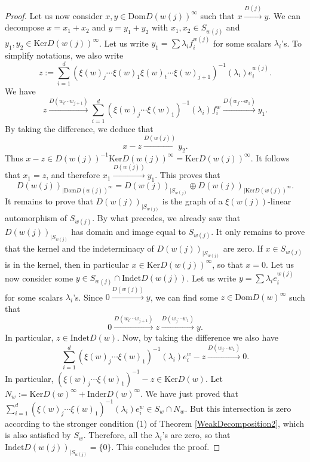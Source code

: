 \documentclass[12pt]{amsart}
\theoremstyle{definition}
\newcommand{\<}{\langle}   %
\renewcommand{\>}{\rangle} %
\begin{document}
\begin{proof}
    Let us now consider $x,y \in \mathrm{Dom}D(w(j))^{\infty}$ such that $x \xrightarrow{D(j)} y$. We can decompose $x = x_1 + x_2$ and $y = y_1 + y_2$ with $x_1,x_2 \in S_{w(j)}$ and $y_1,y_2 \in \mathrm{Ker}D(w(j))^{\infty}$. Let us write $y_1 = \sum \lambda_if_i^{w(j)}$ for some scalars $\lambda_i$'s. To simplify notations, we also write 
    \begin{equation*}
    z := \sum_{i=1}^d (\xi(w)_j\cdots \xi(w)_1\xi(w)_t\cdots \xi(w)_{j+1})^{-1}(\lambda_i) e_i^{w(j)}.
    \end{equation*}
    We have
    \begin{equation*}
         z \xrightarrow{D(w_t\cdots w_{j+1})} \sum_{i=1}^d (\xi(w)_j\cdots \xi(w)_1)^{-1}(\lambda_i) f_i^w \xrightarrow{D(w_j\cdots w_1)} y_1.
    \end{equation*}
    By taking the difference, we deduce that 
    \begin{equation*}
        x - z \xrightarrow{D(w(j))} y_2.
    \end{equation*}
    Thus $x - z \in D(w(j))^{-1} \mathrm{Ker}D(w(j))^{\infty} = \mathrm{Ker}D(w(j))^{\infty}$. It follows that $x_1 = z$, and therefore $x_1 \xrightarrow{D(w(j))} y_1$. This proves that
\begin{equation*}
    D(w(j))_{|\mathrm{Dom}D(w(j))^{\infty}} = D(w(j))_{|S_{w(j)}} \oplus D(w(j))_{|\mathrm{Ker}D(w(j))^{\infty}}.
\end{equation*}
    It remains to prove that $D(w(j))_{|S_{w(j)}}$ is the graph of a $\xi(w(j))$-linear automorphism of $S_{w(j)}$. By what precedes, we already saw that $D(w(j))_{|S_{w(j)}}$ has domain and image equal to $S_{w(j)}$. It only remains to prove that the kernel and the indeterminacy of $D(w(j))_{|S_{w(j)}}$ are zero. If $x \in S_{w(j)}$ is in the kernel, then in particular $x \in \mathrm{Ker}D(w(j))^{\infty}$, so that $x=0$. Let us now consider some $y \in S_{w(j)} \cap \mathrm{Indet}D(w(j))$. Let us write $y = \sum \lambda_ie_i^{w(j)}$ for some scalars $\lambda_i$'s. Since $0 \xrightarrow{D(w(j))} y$, we can find some $z \in \mathrm{Dom}D(w)^{\infty}$ such that 
    \begin{equation*}
        0 \xrightarrow{D(w_t\cdots w_{j+1})} z \xrightarrow{D(w_j\cdots w_1)} y.
    \end{equation*}
    In particular, $z \in \mathrm{Indet}D(w)$. Now, by taking the difference we also have
    \begin{equation*}
        \sum_{i=1}^d (\xi(w)_j\cdots \xi(w)_1)^{-1}(\lambda_i)e_i^w - z\xrightarrow{D(w_j\cdots w_1)} 0.
    \end{equation*}
    In particular, $(\xi(w)_j\cdots \xi(w)_1)^{-1} - z \in \mathrm{Ker}D(w)$. Let $N_w :=\mathrm{Ker}D(w)^{\infty} + \mathrm{Inder}D(w)^{\infty}$. We have just proved that $\sum_{i=1}^d (\xi(w)_j\cdots \xi(w)_1)^{-1}(\lambda_i)e_i^w \in S_w \cap N_w$. But this intersection is zero according to the stronger condition (1) of Theorem \ref{WeakDecomposition2}, which is also satisfied by $S_w$. Therefore, all the $\lambda_i$'s are zero, so that $\mathrm{Indet}D(w(j))_{|S_{w(j)}} = \{0\}$. This concludes the proof.    
\end{proof}
\end{document}
